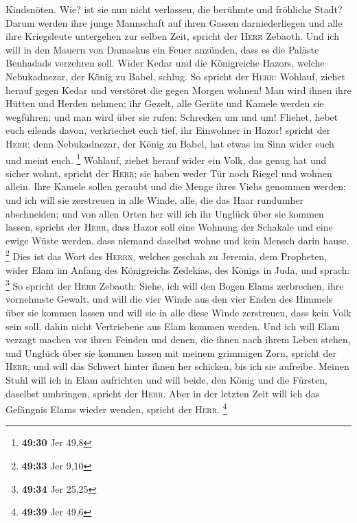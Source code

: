Kindsnöten.  Wie? ist sie nun nicht verlassen, die
berühmte und fröhliche Stadt?  Darum werden ihre junge
Mannschaft auf ihren Gassen darniederliegen und alle ihre Kriegsleute
untergehen zur selben Zeit, spricht der \textsc{Herr} Zebaoth.
 Und ich will in den Mauern von Damaskus ein Feuer
anzünden, dass es die Paläste Benhadads verzehren soll. 
Wider Kedar und die Königreiche Hazors, welche Nebukadnezar, der König
zu Babel, schlug. So spricht der \textsc{Herr}: Wohlauf, ziehet herauf
gegen Kedar und verstöret die gegen Morgen wohnen!  Man
wird ihnen ihre Hütten und Herden nehmen; ihr Gezelt, alle Geräte und
Kamele werden sie wegführen; und man wird über sie rufen: Schrecken um
und um!  Fliehet, hebet euch eilends davon, verkriechet
euch tief, ihr Einwohner in Hazor! spricht der \textsc{Herr}; denn
Nebukadnezar, der König zu Babel, hat etwas im Sinn wider euch und meint
euch. \footnote{\textbf{49:30} Jer 49,8}  Wohlauf, ziehet
herauf wider ein Volk, das genug hat und sicher wohnt, spricht der
\textsc{Herr}; sie haben weder Tür noch Riegel und wohnen allein.
 Ihre Kamele sollen geraubt und die Menge ihres Viehs
genommen werden; und ich will sie zerstreuen in alle Winde, alle, die
das Haar rundumher abschneiden; und von allen Orten her will ich ihr
Unglück über sie kommen lassen, spricht der \textsc{Herr},
 dass Hazor soll eine Wohnung der Schakale und eine ewige
Wüste werden, dass niemand daselbst wohne und kein Mensch darin hause.
\footnote{\textbf{49:33} Jer 9,10}  Dies ist das Wort des
\textsc{Herrn}, welches geschah zu Jeremia, dem Propheten, wider Elam im
Anfang des Königreichs Zedekias, des Königs in Juda, und sprach:
\footnote{\textbf{49:34} Jer 25,25}  So spricht der
\textsc{Herr} Zebaoth: Siehe, ich will den Bogen Elams zerbrechen, ihre
vornehmste Gewalt,  und will die vier Winde aus den vier
Enden des Himmels über sie kommen lassen und will sie in alle diese
Winde zerstreuen, dass kein Volk sein soll, dahin nicht Vertriebene aus
Elam kommen werden.  Und ich will Elam verzagt machen vor
ihren Feinden und denen, die ihnen nach ihrem Leben stehen, und Unglück
über sie kommen lassen mit meinem grimmigen Zorn, spricht der
\textsc{Herr}, und will das Schwert hinter ihnen her schicken, bis ich
sie aufreibe.  Meinen Stuhl will ich in Elam aufrichten
und will beide, den König und die Fürsten, daselbst umbringen, spricht
der \textsc{Herr}.  Aber in der letzten Zeit will ich das
Gefängnis Elams wieder wenden, spricht der \textsc{Herr}. \footnote{\textbf{49:39}
  Jer 49,6}

